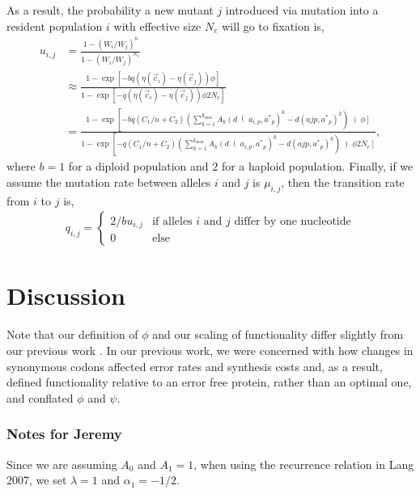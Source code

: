 \documentclass{article}
\newcommand{\Ne}{\ensuremath{{N_e}}\xspace}
\newcommand{\kmax}{\ensuremath{{k_{\max}}}\xspace}
\newcommand{\cvec}{\ensuremath{\Vec{c}}\xspace}
\newcommand{\cveci}{\ensuremath{\cvec_i}\xspace}
\newcommand{\cvecj}{\ensuremath{\cvec_j}\xspace}
\newcommand{\aip}{\ensuremath{a_{i,p}}\xspace}
\newcommand{\aopt}{\ensuremath{a^*}\xspace}
\newcommand{\aoptp}{\ensuremath{\aopt_p}\xspace}
\begin{document}
As a result, the probability a new mutant $j$ introduced via mutation into a resident population $i$ with effective size \Ne will go to fixation is,
\begin{align*}
  u_{i,j} &=  \frac{1 - \left(W_i/W_j\right)^b}{1 - \left(W_i/W_j\right)^\Ne}\\
   &\approx \frac{1-\exp\left[- b q \left(\eta(\cveci)- \eta(\cvecj)\right) \phi\right]}{1-\exp\left[- q \left(\eta(\cveci)- \eta(\cvecj)\right) \phi 2\Ne\right]}\\
   &= \frac{1- \exp\left[- b q \left(C_1/n + C_2\right)\left(\sum_{k=1}^\kmax A_k \left(d\right(\aip,\aoptp\right)^k - d\left(ajp,\aoptp\right)^k\right)\left) \phi\right]}{1-\exp\left[- q \left(C_1/n + C_2\right)\left(\sum_{k=1}^\kmax A_k \left(d\right(\aip,\aoptp\right)^k - d\left(ajp,\aoptp\right)^k\right)\left) \phi 2 \Ne\right]},
\end{align*}
where $b=1$ for a diploid population and $2$ for a haploid population.
Finally, if we assume the mutation rate between alleles $i$ and $j$ is $\mu_{i,j}$, then the transition rate from $i$ to $j$ is,
\begin{align*}
  q_{i,j} = \begin{cases} 2/b u_{i,j} & \text{if alleles $i$ and $j$ differ by one nucleotide}\\
    0 & \text{else}
  \end{cases}
\end{align*}




\section*{Discussion}

Note that our definition of $\phi$ and our scaling of functionality differ slightly from our previous work \citep{Gilchrist07,GilchristEtAl09,ShahAndGilchrist11,GilchristEtAl15a}.
In our previous work, we were concerned with how changes in synonymous codons affected error rates and synthesis costs and, as a result, defined functionality relative to an error free protein, rather than an optimal one, and conflated $\phi$ and $\psi$.




\subsubsection*{Notes for Jeremy}
Since we are assuming $A_0$ and $A_1 = 1$, when using the recurrence relation in Lang 2007, we set $\lambda = 1$ and $\alpha_1 = -1/2$.
\end{document}
